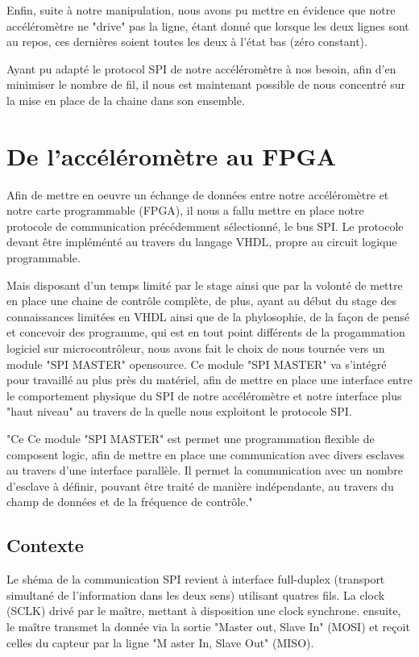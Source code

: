\documentclass[french,a4paper,12pt]{report}
\begin{document}
	Enfin, suite à notre manipulation, nous avons pu mettre en évidence que notre accéléromètre ne "drive" pas la ligne, étant donné que lorsque les deux lignes sont au repos, ces dernières soient toutes les deux à l'état bas (zéro constant).
	
	Ayant pu adapté le protocol SPI de notre accéléromètre à nos besoin, afin d'en minimiser le nombre de fil, il nous est maintenant possible de nous concentré sur la mise en place de la chaine dans son ensemble.
	
	\chapter{De l'accéléromètre au FPGA}
	
		Afin de mettre en oeuvre un échange de données entre notre accéléromètre et notre carte programmable (FPGA), il nous a fallu mettre en place notre protocole de communication précédemment sélectionné, le bus SPI. Le protocole devant être impléménté au travers du langage VHDL, propre au circuit logique programmable.
		
		Mais disposant d'un temps limité par le stage ainsi que par la volonté de mettre en place une chaine de contrôle complète, de plus, ayant au début du stage des connaissances limitées en VHDL ainsi que de la phylosophie, de la façon de pensé et concevoir des programme, qui est en tout point différents de la progammation logiciel sur microcontrôleur, nous avons fait le choix de nous tournée vers un module "SPI MASTER" opensource.		
		Ce module "SPI MASTER" va s'intégré pour travaillé au plus près du matériel, afin de mettre en place une interface entre le comportement physique du SPI de notre accéléromètre et notre interface plus "haut niveau" au travers de la quelle nous exploitont le protocole SPI.
		
		"Ce Ce module "SPI MASTER" est permet une programmation flexible de composent logic, afin de mettre en place une communication avec divers esclaves au travers d'une interface parallèle. Il permet la communication avec un nombre d'esclave à définir, pouvant être traité de manière indépendante, au travers du champ de données et de la fréquence de contrôle."
		
		\section{Contexte}
			Le shéma de la communication SPI revient à interface full-duplex (transport simultané de l'information dans les deux sens) utilisant quatres fils. La clock (SCLK) drivé par le maître, mettant à disposition une clock synchrone. ensuite, le maître transmet la donnée via la sortie "Master out, Slave In" (MOSI) et reçoit celles du capteur par la ligne "M	aster In, Slave Out" (MISO).
			
\end{document}
